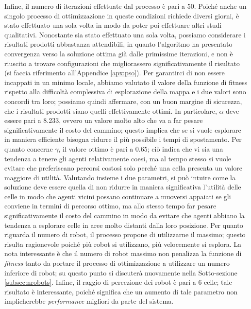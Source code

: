 Infine, il numero di iterazioni effettuate dal processo è pari a 50.
Poiché anche un singolo processo di ottimizzazione in queste condizioni richiede diversi giorni, è stato effettuato una sola volta in modo da poter poi effettuare altri studi qualitativi. 
Nonostante sia stato effettuato una sola volta, possiamo considerare i risultati prodotti abbastanza attendibili, in quanto l'algoritmo ha presentato convergenza verso la soluzione ottima già dalle primissime iterazioni, e non è riuscito a trovare configurazioni che migliorassero significativamente il risultato (si faccia riferimento all'Appendice \ref{apx:pso}).
Per garantirci di non essere incappati in un minimo locale, abbiamo valutato il valore della funzione di fitness rispetto alla difficoltà complessiva di esplorazione della mappa e i due valori sono concordi tra loro; possiamo quindi affermare, con un buon margine di sicurezza, che i risultati prodotti siano quelli effettivamente ottimi.
In particolare, $\alpha$ deve essere pari a 8.233, ovvero un valore molto alto che va a far pesare significativamente il costo del cammino; questo implica che se si vuole esplorare in maniera efficiente bisogna ridurre il più possibile i tempi di spostamento.
Per quanto concerne $\gamma$, il valore ottimo è pari a 0.65; ciò indica che vi sia una tendenza a tenere gli agenti relativamente coesi, ma al tempo stesso si vuole evitare che preferiscano percorsi costosi solo perché una cella presenta un valore maggiore di utilità.
Valutando insieme i due parametri, si può intuire come la soluzione deve essere quella di non ridurre in maniera significativa l'utilità delle celle in modo che agenti vicini possano continuare a muoversi appaiati se gli conviene in termini di percorso ottimo, ma allo stesso tempo far pesare significativamente il costo del cammino in modo da evitare che agenti abbiano la tendenza a esplorare celle in aree molto distanti dalla loro posizione.
Per quanto riguarda il numero di robot, il processo propone di utilizzarne il massimo; questo risulta ragionevole poiché più robot si utilizzano, più velocemente si esplora. La nota interessante è che il numero di robot massimo non penalizza la funzione di \textit{fitness} tanto da portare il processo di ottimizzazione a utilizzare un numero inferiore di robot; su questo punto si discuterà nuovamente nella Sotto-sezione \ref{subsec:nrobots}.
Infine, il raggio di percezione dei robot è pari a 6 celle; tale risultato è interessante, poiché significa che un aumento di tale parametro non implicherebbe \textit{performance} migliori da parte del sistema.

